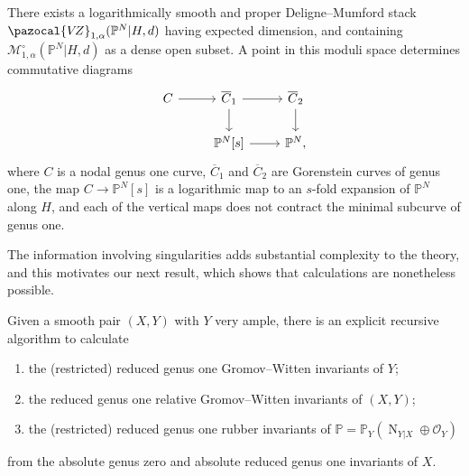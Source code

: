 \documentclass[11pt]{amsart}
\newcommand{\PP}{\mathbb P}
\newcommand{\VZ}{\pazocal{V\!Z}}
\newcommand{\OO}{\mathcal{O}}
\renewcommand{\to}{\rightarrow}
\theoremstyle{definition}
\newenvironment{customthm}[1]
  {\renewcommand\theinnercustomthm{#1}\innercustomthm}
  {\endinnercustomthm}
\theoremstyle{definition}
\begin{document}
\begin{customthm}{A}\label{thm: desingularization}
There exists a logarithmically smooth and proper Deligne--Mumford stack $\VZ_{1,\alpha}(\mathbb P^N|H,d)$ having expected dimension, and containing $\mathcal M_{1,\alpha}^\circ(\mathbb P^N|H,d)$  as a dense open subset. A point in this moduli space determines commutative diagrams
\[
\begin{tikzcd}
C\arrow{r} & \overline C_1\arrow{d}\arrow{r} & \overline C_2\arrow{d} \\ 
& \mathbb P^N[s]\arrow{r} & \mathbb P^N,
\end{tikzcd}
\]
where $C$ is a nodal genus one curve, $\overline C_1$ and $\overline C_2$ are Gorenstein curves of genus one, the map $C\to \PP^N[s]$ is a logarithmic map to an $s$-fold expansion of $\PP^N$ along $H$, and each of the vertical maps does not contract the minimal subcurve of genus one.
\end{customthm}



The information involving singularities adds substantial complexity to the theory, and this motivates our next result, which shows that calculations are nonetheless possible. 

\begin{customthm}{B}\label{thm: recursion}
Given a smooth pair $(X,Y)$ with $Y$ very ample, there is an explicit recursive algorithm to calculate
\begin{enumerate}
\item the (restricted) reduced genus one Gromov--Witten invariants of $Y$;
\item the reduced genus one relative Gromov--Witten invariants of $(X,Y)$; 
\item the (restricted) reduced genus one rubber invariants of $\mathbb{P}=\PP_Y(\operatorname{N}_{Y|X} \oplus \OO_Y)$
\end{enumerate}
from the absolute genus zero and absolute reduced genus one invariants of $X$.
\end{customthm}
\end{document}
